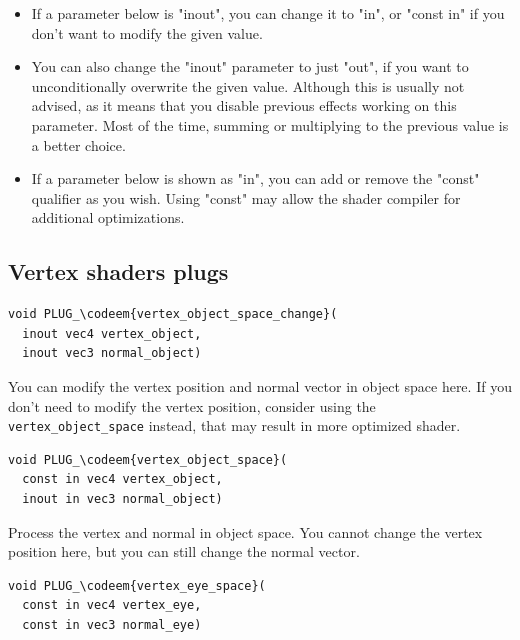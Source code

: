 \documentclass{acmsiggraph}                     %
\newcommand*{\codeem}[1]{\textbf{#1}}
\begin{document}
\begin{itemize}
\itemsep 0pt
\parskip 0pt
\parsep 0pt
\item If a parameter below is "inout", you can change it to "in", or
    "const in" if you don't want to modify the given value.
  \item You can also change the "inout" parameter to just "out", if
    you want to unconditionally overwrite the given value. Although
    this is usually not advised, as it means that you disable previous
    effects working on this parameter. Most of the time, summing or
    multiplying to the previous value is a better choice.
  \item If a parameter below is shown as "in", you can add or remove
    the "const" qualifier as you wish. Using "const" may allow the
    shader compiler for additional optimizations.
\end{itemize}

\subsection{Vertex shaders plugs}

\begin{Verbatim}[commandchars=\\\{\},frame=single]
void PLUG_\codeem{vertex_object_space_change}(
  inout vec4 vertex_object,
  inout vec3 normal_object)
\end{Verbatim}

You can modify the vertex position and normal vector in object space here.
If you don't need to modify the vertex position,
consider using the \texttt{vertex\_object\_space}
instead, that may result in more optimized shader.

\begin{Verbatim}[commandchars=\\\{\},frame=single]
void PLUG_\codeem{vertex_object_space}(
  const in vec4 vertex_object,
  inout in vec3 normal_object)
\end{Verbatim}

Process the vertex and normal in object space. You cannot change the vertex
position here, but you can still change the normal vector.

\begin{Verbatim}[commandchars=\\\{\},frame=single]
void PLUG_\codeem{vertex_eye_space}(
  const in vec4 vertex_eye,
  const in vec3 normal_eye)
\end{Verbatim}
\end{document}
